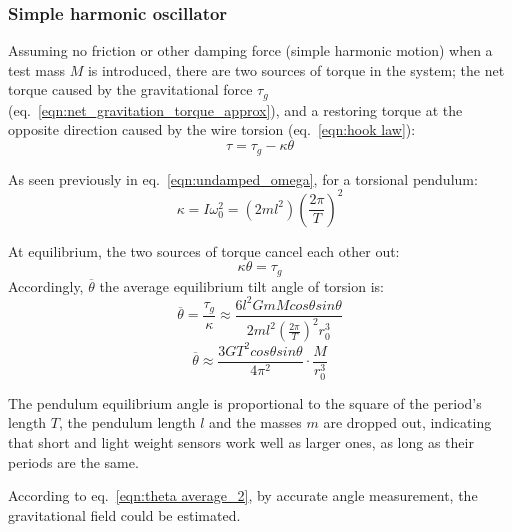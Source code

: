 \documentclass[\main/master.tex]{subfiles}
\begin{document}
\subsubsection{Simple harmonic oscillator}
Assuming no friction or other damping force (simple harmonic motion) when a test mass $M$ is introduced, there are two sources of torque in the system; the net torque caused by the gravitational force $\tau_g$ (eq.~\ref{eqn:net_gravitation_torque_approx}), and a restoring torque at the opposite direction caused by the wire torsion (eq.~\ref{eqn:hook law}):
\begin{equation}
\tau = \tau_g - \kappa\theta     \label{eqn:gravitation_torque}
\end{equation}
\par\noindent
As seen previously in eq.~\ref{eqn:undamped_omega}, for a torsional pendulum:
\begin{equation}
\kappa = I\omega_0^2 = (2ml^2)(\frac{2\pi}{T})^2     \label{eqn:moment_inertia}
\end{equation} 
\par\noindent
At equilibrium, the two sources of torque cancel each other out:
\begin{equation}
\kappa\theta = \tau_g    \label{eqn:gravitation_torque_equilibrium}
\end{equation}
Accordingly, $\overline{\theta}$ the average equilibrium tilt angle of torsion is:
\begin{equation}
\overline{\theta} = \frac{\tau_g}{\kappa}  \approx \frac{6l^2GmMcos\theta sin\theta}{2ml^2 (\frac{2\pi}{T})^2 r_0^3}   \label{eqn:theta average}
\end{equation} 
\begin{equation}
\overline{\theta}  \approx \frac{3GT^2cos\theta sin\theta}{4\pi^2 } \cdot \frac{M}{r_0^3}   \label{eqn:theta average_2}
\end{equation}
\par\noindent
The pendulum equilibrium angle is proportional to the square of the period's length $T$, the pendulum length $l$ and the masses $m$ are dropped out, indicating that short and light weight sensors work well as larger ones, as long as their periods are the same.
\par\noindent
According to eq.~\ref{eqn:theta average_2}, by accurate angle measurement, the gravitational field could be estimated.
 
\end{document}
